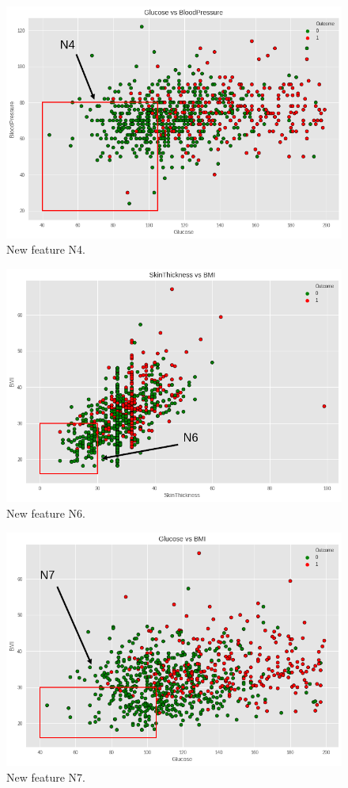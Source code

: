 \documentclass[12pt]{article}
\begin{document}
\begin{figure}[ht]
\centering
\includegraphics[width=1\textwidth]{download(3).png}
\caption{\label{fig:20}  New feature N4.}
\end{figure}

\begin{figure}[ht]
\centering
\includegraphics[width=1\textwidth]{download(4).png}
\caption{\label{fig:21}  New feature N6.}
\end{figure}

\begin{figure}[ht]
\centering
\includegraphics[width=1\textwidth]{download(5).png}
\caption{\label{fig:22}  New feature N7.}
\end{figure}
\end{document}
